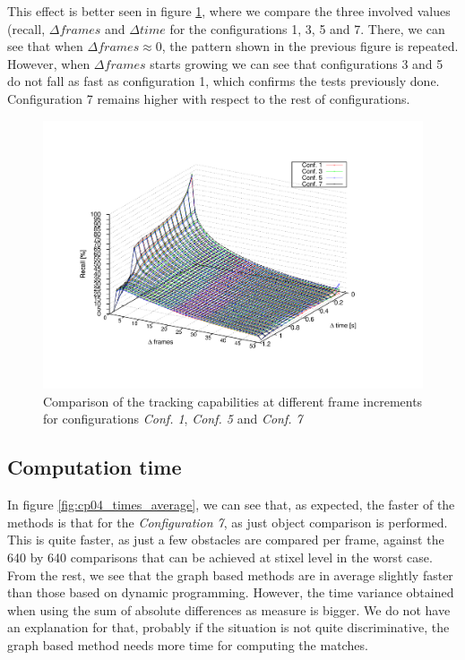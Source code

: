 This effect is better seen in figure \ref{fig:cp04_recall_vs_delta_frames_vs_step}, where we compare the three involved values (recall, $\Delta frames$ and $\Delta time$ for the configurations 1, 3, 5 and 7. There, we can see that when $\Delta frames \approx 0$, the pattern shown in the previous figure is repeated. However, when $\Delta frames$ starts growing we can see that configurations 3 and 5 do not fall as fast as configuration 1, which confirms the tests previously done. Configuration 7 remains higher with respect to the rest of configurations.

\begin{figure}[h!]
\centering
\includegraphics[trim=80 90 140 90,clip]{recall_vs_delta_frames_vs_step_28b_1_16b}
\caption{Comparison of the tracking capabilities at different frame increments for configurations \emph{Conf. 1}, \emph{Conf. 5} and \emph{Conf. 7}}\label{fig:cp04_recall_vs_delta_frames_vs_step}
\end{figure}

\subsection{Computation time}\label{ch:chapter04_02_04}

In figure \ref{fig:cp04_times_average}, we can see that, as expected, the faster of the methods is that for the \emph{Configuration 7}, as just object comparison is performed. This is quite faster, as just a few obstacles are compared per frame, against the 640 by 640 comparisons that can be achieved at stixel level in the worst case. From the rest, we see that the graph based methods are in average slightly faster than those based on dynamic programming. However, the time variance obtained when using the sum of absolute differences as measure is bigger. We do not have an explanation for that, probably if the situation is not quite discriminative, the graph based method needs more time for computing the matches.

